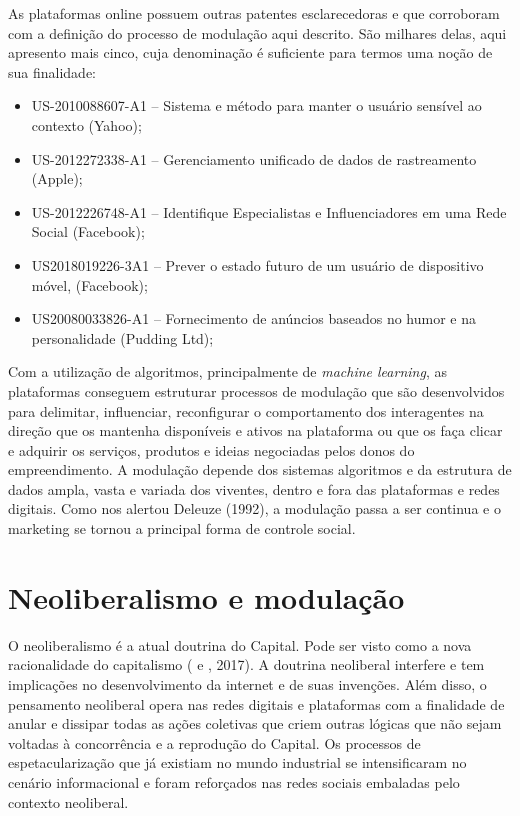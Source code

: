 As plataformas online possuem outras patentes esclarecedoras e que
corroboram com a definição do processo de modulação aqui descrito. São
milhares delas, aqui apresento mais cinco, cuja denominação é suficiente
para termos uma noção de sua finalidade:

\begin{itemize}
\item
  US-2010088607-A1 -- Sistema e método para manter o usuário sensível ao
  contexto (Yahoo);
\item
  US-2012272338-A1 -- Gerenciamento unificado de dados de rastreamento
  (Apple);
\item
  US-2012226748-A1 -- Identifique Especialistas e Influenciadores em uma
  Rede Social (Facebook);
\item
  US2018019226-3A1 -- Prever o estado futuro de um usuário de dispositivo
  móvel, (Facebook);
\item
  US20080033826-A1 -- Fornecimento de anúncios baseados no humor e na
  personalidade (Pudding Ltd);
\end{itemize}

Com a utilização de algoritmos, principalmente de \emph{machine
learning}, as plataformas conseguem estruturar processos de modulação
que são desenvolvidos para delimitar, influenciar, reconfigurar o
comportamento dos interagentes na direção que os mantenha disponíveis e
ativos na plataforma ou que os faça clicar e adquirir os serviços,
produtos e ideias negociadas pelos donos do empreendimento. A modulação
depende dos sistemas algoritmos e da estrutura de dados ampla, vasta e
variada dos viventes, dentro e fora das plataformas e redes digitais.
Como nos alertou Deleuze (1992), a modulação passa a ser continua e o
marketing se tornou a principal forma de controle social.

\section{Neoliberalismo e modulação}

O neoliberalismo é a atual doutrina do Capital. Pode ser visto como a
nova racionalidade do capitalismo ( e , 2017). A doutrina
neoliberal interfere e tem implicações no desenvolvimento da internet e
de suas invenções. Além disso, o pensamento neoliberal opera nas redes
digitais e plataformas com a finalidade de anular e dissipar todas as
ações coletivas que criem outras lógicas que não sejam voltadas à
concorrência e a reprodução do Capital. Os processos de
espetacularização que já existiam no mundo industrial se intensificaram
no cenário informacional e foram reforçados nas redes sociais embaladas
pelo contexto neoliberal.


